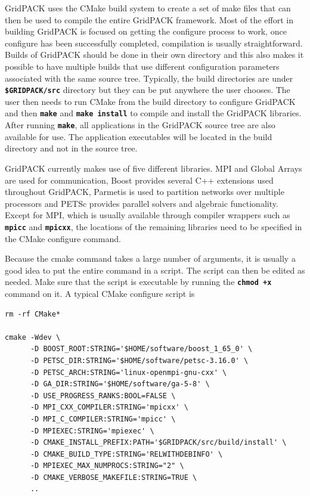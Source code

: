 GridPACK uses the CMake build system to create a set of make files that can then be used to compile the entire GridPACK framework. Most of the effort in building GridPACK is focused on getting the configure process to work, once configure has been successfully completed, compilation is usually straightforward. Builds of GridPACK should be done in their own directory and this also makes it possible to have multiple builds that use different configuration parameters associated with the same source tree. Typically, the build directories are under \texttt{\textbf{\$GRIDPACK/src}} directory but they can be put anywhere the user chooses. The user then needs to run CMake from the build directory to configure GridPACK and then \texttt{\textbf{make}} and \texttt{\textbf{make install}} to compile and install the GridPACK libraries. After running \texttt{\textbf{make}}, all applications in the GridPACK source tree are also available for use. The application executables will be located in the build directory and not in the source tree. 

GridPACK currently makes use of five different libraries. MPI and Global Arrays are used for communication, Boost provides several C++ extensions used throughout GridPACK, Parmetis is used to partition networks over multiple processors and PETSc provides parallel solvers and algebraic functionality. Except for MPI, which is usually available through compiler wrappers such as \texttt{\textbf{mpicc}} and \texttt{\textbf{mpicxx}}, the locations of the remaining libraries need to be specified in the CMake configure command.

Because the cmake command takes a large number of arguments, it is usually a good idea to put the entire command in a script. The script can then be edited as needed. Make sure that the script is executable by running the \texttt{\textbf{chmod +x}} command on it. A typical CMake configure script is

{
\color{red}
\begin{Verbatim}[fontseries=b]
rm -rf CMake*

cmake -Wdev \
      -D BOOST_ROOT:STRING='$HOME/software/boost_1_65_0' \
      -D PETSC_DIR:STRING='$HOME/software/petsc-3.16.0' \
      -D PETSC_ARCH:STRING='linux-openmpi-gnu-cxx' \
      -D GA_DIR:STRING='$HOME/software/ga-5-8' \
      -D USE_PROGRESS_RANKS:BOOL=FALSE \
      -D MPI_CXX_COMPILER:STRING='mpicxx' \
      -D MPI_C_COMPILER:STRING='mpicc' \
      -D MPIEXEC:STRING='mpiexec' \
      -D CMAKE_INSTALL_PREFIX:PATH='$GRIDPACK/src/build/install' \
      -D CMAKE_BUILD_TYPE:STRING='RELWITHDEBINFO' \
      -D MPIEXEC_MAX_NUMPROCS:STRING="2" \
      -D CMAKE_VERBOSE_MAKEFILE:STRING=TRUE \
      ..
\end{Verbatim}
}

